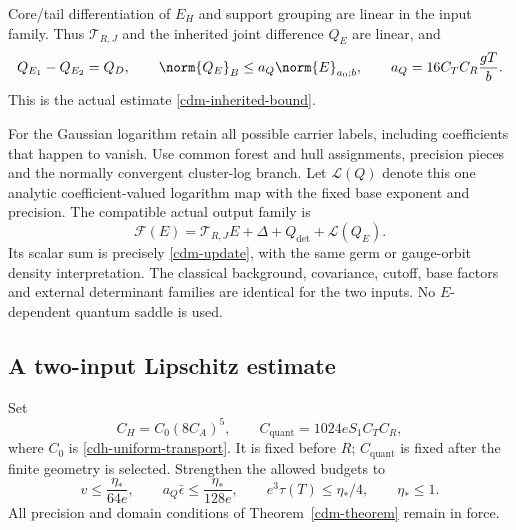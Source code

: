Core/tail differentiation of $E_H$ and support grouping are
linear in the input family. Thus $\mathcal T_{R,J}$ and the
inherited joint difference $Q_E$ are linear, and
\begin{equation}
 Q_{E_1}-Q_{E_2}=Q_D,\qquad
 \norm{Q_E}_B\le a_Q\norm{E}_{a_0;b},\qquad
 a_Q=16C_TC_R\frac{gT}{b}.
 \label{cdq-Q-linear}
\end{equation}
This is the actual estimate \eqref{cdm-inherited-bound}.

For the Gaussian logarithm retain all possible carrier
labels, including coefficients that happen to vanish.
Use common forest and hull assignments, precision pieces
and the normally convergent cluster-log branch. Let
$\mathcal L(Q)$ denote this one analytic coefficient-valued
logarithm map with the fixed base exponent and precision.
The compatible actual output family is
\begin{equation}
 \mathscr F(E)=
 \mathcal T_{R,J}E+\Delta+Q_{\det}+\mathcal L(Q_E).
 \label{cdq-output-map}
\end{equation}
Its scalar sum is precisely \eqref{cdm-update}, with the
same germ or gauge-orbit density interpretation. The
classical background, covariance, cutoff, base factors
and external determinant families are identical for
the two inputs. No $E$-dependent quantum saddle is used.

\subsection{A two-input Lipschitz estimate}
\label{cdq-theorem-section}

Set
\begin{equation}
 C_H=C_0(8C_A)^5,\qquad
 C_{\mathrm{quant}}=1024eS_1C_TC_R,
 \label{cdq-constants}
\end{equation}
where $C_0$ is \eqref{cdh-uniform-transport}. It is fixed
before $R$; $C_{\mathrm{quant}}$ is fixed after the finite
geometry is selected. Strengthen the allowed budgets to
\begin{equation}
 v\le\frac{\eta_*}{64e},\qquad
 a_Q\bar\epsilon\le\frac{\eta_*}{128e},\qquad
 e^3\tau(T)\le\eta_*/4,\qquad \eta_*\le1.
 \label{cdq-budgets}
\end{equation}
All precision and domain conditions of
Theorem~\ref{cdm-theorem} remain in force.

